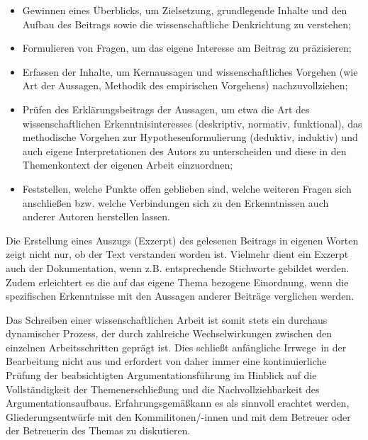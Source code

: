 \documentclass[a4paper, 12pt]{article}
\begin{document}
\begin{itemize}

\item Gewinnen eines \"{U}berblicks, um Zielsetzung, grundlegende Inhalte und den Aufbau
des Beitrags sowie die wissenschaftliche Denkrichtung zu verstehen;

\item Formulieren von Fragen, um das eigene Interesse am Beitrag zu pr\"{a}zisieren;

\item Erfassen der Inhalte, um Kernaussagen und wissenschaftliches Vorgehen (wie Art
der Aussagen, Methodik des empirischen Vorgehens) nachzuvollziehen;

\item Pr\"{u}fen des Erkl\"{a}rungsbeitrags der Aussagen, um etwa die Art des
wissenschaftlichen Erkenntnisinteresses (deskriptiv, normativ, funktional), das
methodische Vorgehen zur Hypothesenformulierung (deduktiv, induktiv) und auch eigene
Interpretationen des Autors zu unterscheiden und diese in den Themenkontext der
eigenen Arbeit einzuordnen;

\item Feststellen, welche Punkte offen geblieben sind, welche weiteren Fragen sich
anschlie\ss en bzw. welche Verbindungen sich zu den Erkenntnissen auch anderer Autoren
herstellen lassen.

\end{itemize}

Die Erstellung eines Auszugs (Exzerpt) des gelesenen Beitrags in eigenen Worten
zeigt nicht nur, ob der Text verstanden worden ist. Vielmehr dient ein Exzerpt auch
der Dokumentation, wenn z.B. entsprechende Stichworte gebildet werden. Zudem
erleichtert es die auf das eigene Thema bezogene Einordnung, wenn die spezifischen
Erkenntnisse mit den Aussagen anderer Beitr\"{a}ge verglichen werden.

Das Schreiben einer wissenschaftlichen Arbeit ist somit stets ein durchaus
dynamischer Prozess, der durch zahlreiche Wechselwirkungen zwischen den einzelnen
Arbeitsschritten gepr\"{a}gt ist. Dies schlie\ss t anf\"{a}ngliche \glqq Irrwege\grqq\ in der
Bearbeitung nicht aus und erfordert von daher immer eine kontinuierliche Pr\"{u}fung der
beabsichtigten Argumentationsf\"{u}hrung im Hinblick auf die Vollst\"{a}ndigkeit der
Themenerschlie\ss ung und die Nachvollziehbarkeit des Argumentationsaufbaus.
Erfahrungsgem\"{a}\ss  kann es als sinnvoll erachtet werden, Gliederungsentw\"{u}rfe mit den
Kommilitonen/-innen und mit dem Betreuer oder der Betreuerin des Themas zu
diskutieren.
\end{document}
